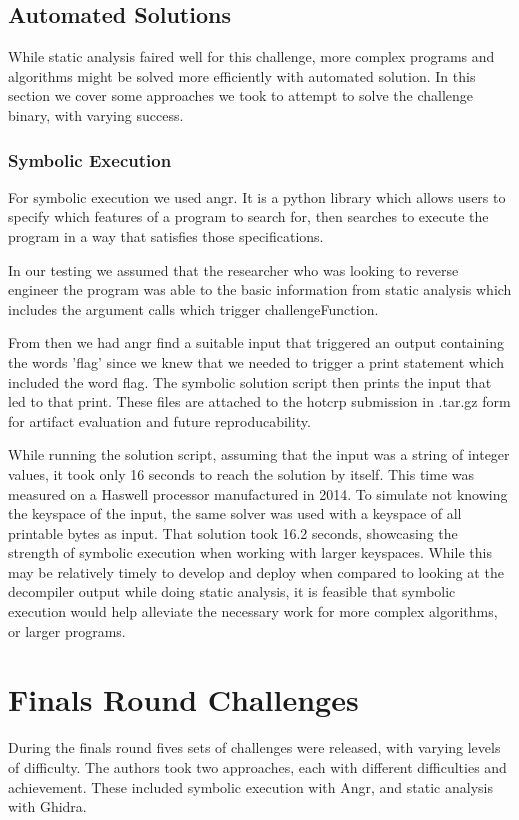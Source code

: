 \documentclass[conference]{IEEEtran}
\begin{document}
\subsection{Automated Solutions}
While static analysis faired well for this challenge, more complex programs and algorithms might be solved more efficiently with automated solution. In this section we cover some approaches we took to attempt to solve the  challenge binary, with varying success.


\subsubsection{Symbolic Execution}
For symbolic execution we used angr\cite{angr}. It is a python library which allows users to specify which features of a program to search for, then searches to execute the program in a way that satisfies those specifications. 

In our testing we assumed that the researcher who was looking to reverse engineer the program was able to the basic information from static analysis which includes the argument calls which trigger challengeFunction. 

From then we had angr find a suitable input that triggered an output containing the words 'flag' since we knew that we needed to trigger a print statement which included the word flag. The symbolic solution script then prints the input that led to that print. These files are attached to the hotcrp submission in .tar.gz form for artifact evaluation and future reproducability.

While running the solution script, assuming that the input was a string of integer values, it took only 16 seconds to reach the solution by itself. This time was measured on a Haswell processor manufactured in 2014. To simulate not knowing the keyspace of the input, the same solver was used with a keyspace of all printable bytes as input. That solution took 16.2 seconds, showcasing the strength of symbolic execution when working with larger keyspaces. While this may be relatively timely to develop and deploy when compared to looking at the decompiler output while doing static analysis, it is feasible that symbolic execution would help alleviate the necessary work for more complex algorithms, or larger programs.

\section{Finals Round Challenges}
During the finals round fives sets of challenges were released, with varying levels of difficulty. The authors took two approaches, each with different difficulties and achievement. These included symbolic execution with Angr, and static analysis with Ghidra.
\end{document}
